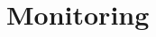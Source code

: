\documentclass{article}
\begin{document}


                


    \section{Monitoring}
    \label{sec:monitoring}
\end{document}
